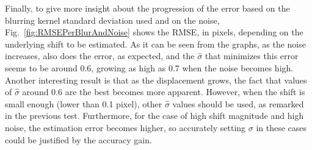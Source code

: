 Finally, to give more insight about the progression of the error based on the blurring kernel standard deviation used and on the noise, Fig.~\ref{fig:RMSEPerBlurAndNoise} shows the RMSE, in pixels, depending on the underlying shift to be estimated. As it can be seen from the graphs, as the noise increases, also does the error, as expected, and the $\hat{\sigma}$ that minimizes this error seems to be around 0.6, growing as high as 0.7 when the noise becomes high. Another interesting result is that as the displacement grows, the fact that values of $\hat{\sigma}$ around 0.6 are the best becomes more apparent. However, when the shift is small enough (lower than 0.1 pixel), other $\hat{\sigma}$ values should be used, as remarked in the previous test. Furthermore, for the case of high shift magnitude and high noise, the estimation error becomes higher, so accurately setting $\sigma$ in these cases could be justified by the accuracy gain.

